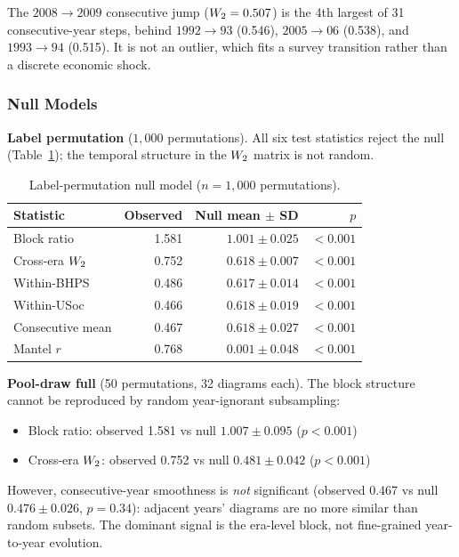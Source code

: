 The $2008 \to 2009$ consecutive jump ($W_2 = 0.507$) is the 4th largest of 31
consecutive-year steps, behind $1992 \to 93$ (0.546), $2005 \to 06$ (0.538), and
$1993 \to 94$ (0.515).
It is not an outlier, which fits a survey transition rather than a discrete
economic shock.

\subsubsection{Null Models}

\textbf{Label permutation} ($1{,}000$ permutations).
All six test statistics reject the null (Table~\ref{tab:null_permutation}); the
temporal structure in the $W_2$ matrix is not random.

\begin{table}[htbp]
  \centering
  \caption{Label-permutation null model ($n = 1{,}000$ permutations).}
  \label{tab:null_permutation}
  \begin{tabular}{lrrr}
    \toprule
    Statistic & Observed & Null mean $\pm$ SD & $p$ \\
    \midrule
    Block ratio       & 1.581 & $1.001 \pm 0.025$ & $< 0.001$ \\
    Cross-era $W_2$ & 0.752 & $0.618 \pm 0.007$ & $< 0.001$ \\
    Within-BHPS       & 0.486 & $0.617 \pm 0.014$ & $< 0.001$ \\
    Within-USoc       & 0.466 & $0.618 \pm 0.019$ & $< 0.001$ \\
    Consecutive mean  & 0.467 & $0.618 \pm 0.027$ & $< 0.001$ \\
    Mantel $r$        & 0.768 & $0.001 \pm 0.048$ & $< 0.001$ \\
    \bottomrule
  \end{tabular}
\end{table}

\textbf{Pool-draw full} (50 permutations, 32 diagrams each).
The block structure cannot be reproduced by random year-ignorant subsampling:
\begin{itemize}
  \item Block ratio: observed 1.581 vs null $1.007 \pm 0.095$ ($p < 0.001$)
  \item Cross-era $W_2$: observed 0.752 vs null $0.481 \pm 0.042$
    ($p < 0.001$)
\end{itemize}
However, consecutive-year smoothness is \emph{not} significant (observed 0.467
vs null $0.476 \pm 0.026$, $p = 0.34$): adjacent years' diagrams are no more
similar than random subsets.
The dominant signal is the era-level block, not fine-grained year-to-year
evolution.

